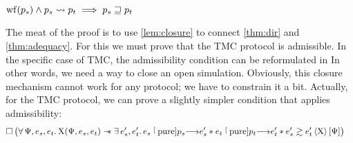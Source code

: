 \begin{theorem} \label{thm:soundness}
    $
        \wf{\datalangProg_s} \wedge \datalangProg_s \tmc \datalangProg_t \implies
        \datalangProg_s \refined \datalangProg_t
    $
\end{theorem}

The meat of the proof is to use \cref{lem:closure} to connect  \cref{thm:dir} and \cref{thm:adequacy}.
For this we must prove that the TMC protocol is admissible.
In the specific case of TMC, the admissibility condition
can be reformulated in 
In other words, we need a way to close an open simulation.
Obviously, this closure mechanism cannot work for any protocol; we have to constrain it a bit.
Actually, for the TMC protocol, we can prove a slightly simpler condition that applies admissibility:
    \begin{align*}
            &
            \iPersistent \left(
                \forall \iPredTwo, \datalangExpr_s, \datalangExpr_t \ldotp
                \iProt (\iPredTwo, \datalangExpr_s, \datalangExpr_t) \iWand
                \exists \datalangExpr_s', \datalangExpr_t' \ldotp
                \datalangExpr_s \pureStep{\datalangProg_s} \datalangExpr_s' \iSep
                \datalangExpr_t \pureStep{\datalangProg_t} \datalangExpr_t' \iSep
                \iSim[\iProt]{\iPredTwo}{\datalangExpr_s'}{\datalangExpr_t'}
            \right) 
    \end{align*}


